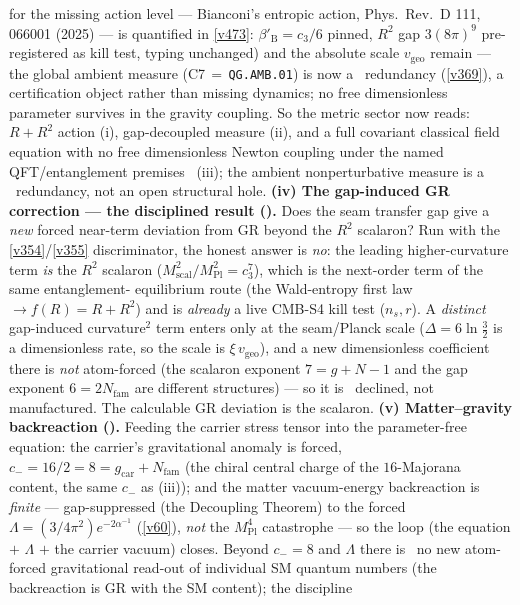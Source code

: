 \documentclass[11pt,a4paper]{article}
\newcommand{\cthree}{c_3}
\newcommand{\Mpl}{M_{\mathrm{Pl}}}
\newcommand{\Nfam}{N_{\mathrm{fam}}}
\begin{document}
\begin{keybox}
for the missing action level --- Bianconi's entropic action, Phys.\ Rev.\ D 111, 066001 (2025) --- is quantified in
\vref{v473}: $\beta'_{\mathrm B}=\cthree/6$ pinned, $R^2$ gap $3(8\pi)^9$ pre-registered as kill test, typing
unchanged) and the absolute scale
$v_{\mathrm{geo}}$ remain \mO --- the global ambient measure (C7\,$=$\,\texttt{QG.AMB.01}) is now a \mC\ redundancy
(\vref{v369}), a certification object rather than missing dynamics; no free dimensionless parameter survives in the
gravity coupling. So the metric sector now reads: $R{+}R^2$ action (i), gap-decoupled measure (ii), and a
full covariant classical field equation with no free dimensionless Newton coupling under the named QFT/entanglement premises \mC\ (iii); the ambient nonperturbative measure is a
\mC\ redundancy, not an open structural hole.
\textbf{(iv) The gap-induced GR correction --- the disciplined result ().} Does
the seam transfer gap give a \emph{new} forced near-term deviation from GR beyond the $R^2$ scalaron? Run with the
\vref{v354}/\vref{v355} discriminator, the honest answer is \emph{no}: the leading higher-curvature term \emph{is}
the $R^2$ scalaron ($M_{\mathrm{scal}}^2/\Mpl^2=\cthree^7$), which is the next-order term of the same entanglement-
equilibrium route (the Wald-entropy first law $\to f(R){=}R{+}R^2$) and is \emph{already} a live CMB-S4 kill test
($n_s,r$). A \emph{distinct} gap-induced curvature$^2$ term enters only at the seam/Planck scale ($\Delta=6\ln\tfrac32$
is a dimensionless rate, so the scale is $\xi\,v_{\mathrm{geo}}$), and a new dimensionless coefficient there is
\emph{not} atom-forced (the scalaron exponent $7{=}g{+}N{-}1$ and the gap exponent $6{=}2\Nfam$ are different
structures) --- so it is \mO\ declined, not manufactured. The calculable GR deviation is the scalaron.
\textbf{(v) Matter--gravity backreaction ().} Feeding the carrier stress tensor into
the parameter-free equation: the carrier's gravitational anomaly is forced, $c_-=16/2=8=g_{\mathrm{car}}{+}\Nfam$ (the
chiral central charge of the $16$-Majorana content, the same $c_-$ as (iii)); and the matter vacuum-energy
backreaction is \emph{finite} --- gap-suppressed (the Decoupling Theorem) to the forced $\Lambda=(3/4\pi^2)
e^{-2\alpha^{-1}}$ (\vref{v60}), \emph{not} the $M_{\mathrm{Pl}}^4$ catastrophe --- so the loop (the equation $+$
$\Lambda$ $+$ the carrier vacuum) closes. Beyond $c_-{=}8$ and $\Lambda$ there is \mO\ no new atom-forced
gravitational read-out of individual SM quantum numbers (the backreaction is GR with the SM content); the discipline

\end{keybox}
\end{document}
